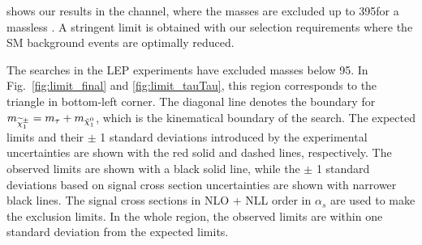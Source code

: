 shows our results in the \tauTau channel, where the \chione masses are excluded up to 395\GeV for a massless \PSGczDo. 
A stringent limit is obtained with our selection requirements where the SM background events are optimally reduced.

The \sTau searches in the LEP experiments \cite{lepsusy} have excluded masses below 95\GeV. In Fig.~\ref{fig:limit_final} and 
\ref{fig:limit_tauTau}, this region corresponds to the triangle in bottom-left corner. 
The diagonal line denotes the boundary for $m_{\widetilde{\chi}^{\pm}_1} = m_{\tau} + m_{\tilde{\chi}^{0}_1}$, which is the kinematical boundary of the search.
The expected limits and their $\pm$ 1 standard deviations introduced by the experimental 
uncertainties are shown with the red solid and dashed lines, respectively. 
The observed limits are shown with a black solid line, 
while the $\pm$ 1 standard deviations based on signal cross section uncertainties are shown with narrower black lines.
The signal cross sections in NLO + NLL order in $\alpha_s$ are used to make the exclusion limits.
In the whole region, the observed limits are within one standard deviation from the expected limits.  


